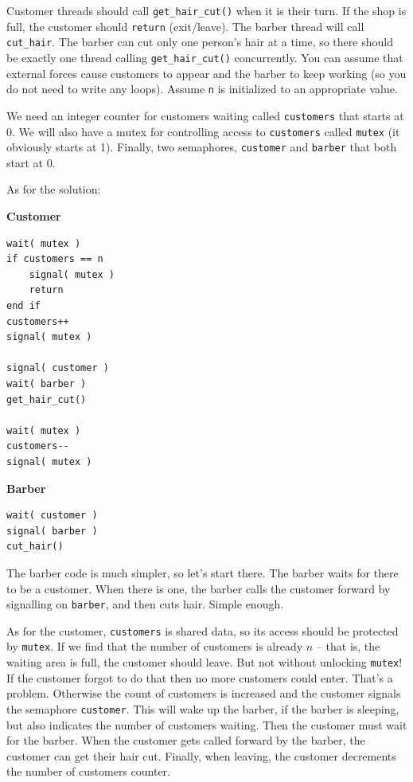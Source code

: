 \documentclass[a4paper]{report}
\begin{document}
Customer threads should call \texttt{get\_hair\_cut()} when it is their turn. If the shop is full, the customer should \texttt{return} (exit/leave). The barber thread will call \texttt{cut\_hair}. The barber can cut only one person's hair at a time, so there should be exactly one thread calling \texttt{get\_hair\_cut()} concurrently. You can assume that external forces cause customers to appear and the barber to keep working (so you do not need to write any loops). Assume \texttt{n} is initialized to an appropriate value.

We need an integer counter for customers waiting called \texttt{customers} that starts at 0. We will also have a mutex for controlling access to \texttt{customers} called \texttt{mutex} (it obviously starts at 1). Finally, two semaphores, \texttt{customer} and \texttt{barber} that both start at 0.

As for the solution:
\begin{multicols}{2}
	\textbf{Customer}
	\begin{lstlisting}
wait( mutex )
if customers == n
    signal( mutex )
    return
end if
customers++
signal( mutex )

signal( customer )
wait( barber )
get_hair_cut()

wait( mutex )
customers--
signal( mutex )
\end{lstlisting}
	\columnbreak
	\textbf{Barber}
	\begin{lstlisting}
wait( customer )
signal( barber )
cut_hair()
  \end{lstlisting}
\end{multicols}


The barber code is much simpler, so let's start there. The barber waits for there to be a customer. When there is one, the barber calls the customer forward by signalling on \texttt{barber}, and then cuts hair. Simple enough.

As for the customer, \texttt{customers} is shared data, so its access should be protected by \texttt{mutex}. If we find that the number of customers is already $n$ -- that is, the waiting area is full, the customer should leave. But not without unlocking \texttt{mutex}! If the customer forgot to do that then no more customers could enter. That's a problem. Otherwise the count of customers is increased and the customer signals the semaphore \texttt{customer}. This will wake up the barber, if the barber is sleeping, but also indicates the number of customers waiting. Then the customer must wait for the barber. When the customer gets called forward by the barber, the customer can get their hair cut. Finally, when leaving, the customer decrements the number of customers counter.
\end{document}
